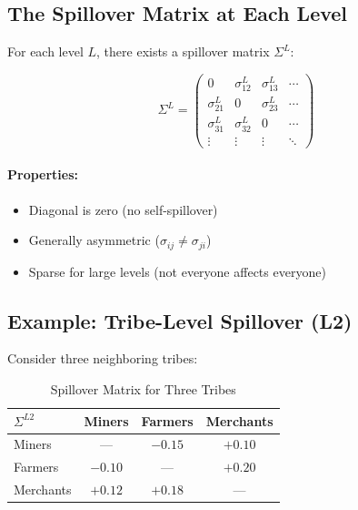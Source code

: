 \subsection{The Spillover Matrix at Each Level}

For each level $L$, there exists a spillover matrix $\Sigma^L$:

\begin{equation}
\Sigma^L = \begin{pmatrix}
0 & \sigma^L_{12} & \sigma^L_{13} & \cdots \\
\sigma^L_{21} & 0 & \sigma^L_{23} & \cdots \\
\sigma^L_{31} & \sigma^L_{32} & 0 & \cdots \\
\vdots & \vdots & \vdots & \ddots
\end{pmatrix}
\end{equation}

\paragraph{Properties:}
\begin{itemize}
\item Diagonal is zero (no self-spillover)
\item Generally asymmetric ($\sigma_{ij} \neq \sigma_{ji}$)
\item Sparse for large levels (not everyone affects everyone)
\end{itemize}

\subsection{Example: Tribe-Level Spillover (L2)}

Consider three neighboring tribes:

\begin{table}[htbp]
\centering
\caption{Spillover Matrix for Three Tribes}
\label{tab:aaa-tribe-spillover}
\renewcommand{\arraystretch}{1.3}
\begin{tabular}{@{}l|ccc@{}}
\toprule
$\Sigma^{L2}$ & Miners & Farmers & Merchants \\
\midrule
Miners & --- & $-0.15$ & $+0.10$ \\
Farmers & $-0.10$ & --- & $+0.20$ \\
Merchants & $+0.12$ & $+0.18$ & --- \\
\bottomrule
\end{tabular}
\end{table}

